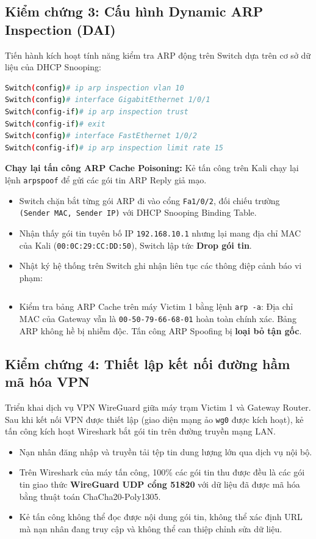 \subsection{Kiểm chứng 3: Cấu hình Dynamic ARP Inspection (DAI)}

Tiến hành kích hoạt tính năng kiểm tra ARP động trên Switch dựa trên cơ sở dữ liệu của DHCP Snooping:
\begin{lstlisting}[language=bash]
Switch(config)# ip arp inspection vlan 10
Switch(config)# interface GigabitEthernet 1/0/1
Switch(config-if)# ip arp inspection trust
Switch(config-if)# exit
Switch(config)# interface FastEthernet 1/0/2
Switch(config-if)# ip arp inspection limit rate 15
\end{lstlisting}

\textbf{Chạy lại tấn công ARP Cache Poisoning:} Kẻ tấn công trên Kali chạy lại lệnh \texttt{arpspoof} để gửi các gói tin ARP Reply giả mạo.
\begin{itemize}
  \item Switch chặn bắt từng gói ARP đi vào cổng \texttt{Fa1/0/2}, đối chiếu trường \texttt{(Sender MAC, Sender IP)} với DHCP Snooping Binding Table.
  \item Nhận thấy gói tin tuyên bố IP \texttt{192.168.10.1} nhưng lại mang địa chỉ MAC của Kali (\texttt{00:0C:29:CC:DD:50}), Switch lập tức \textbf{Drop gói tin}.
  \item Nhật ký hệ thống trên Switch ghi nhận liên tục các thông điệp cảnh báo vi phạm:
  \begin{lstlisting}[language=bash]
%SW_DAI-4-DHCP_SNOOPING_DENY: 1 invalid ARPs (Req) on Fa1/0/2, vlan 10. ([000c.29cc.dd50/192.168.10.50/0000.0000.0000/192.168.10.1/])
  \end{lstlisting}
  \item Kiểm tra bảng ARP Cache trên máy Victim 1 bằng lệnh \texttt{arp -a}: Địa chỉ MAC của Gateway vẫn là \texttt{00-50-79-66-68-01} hoàn toàn chính xác. Bảng ARP không hề bị nhiễm độc. Tấn công ARP Spoofing bị \textbf{loại bỏ tận gốc}.
\end{itemize}

\subsection{Kiểm chứng 4: Thiết lập kết nối đường hầm mã hóa VPN}

Triển khai dịch vụ VPN WireGuard giữa máy trạm Victim 1 và Gateway Router. Sau khi kết nối VPN được thiết lập (giao diện mạng ảo \texttt{wg0} được kích hoạt), kẻ tấn công kích hoạt Wireshark bắt gói tin trên đường truyền mạng LAN.
\begin{itemize}
  \item Nạn nhân đăng nhập và truyền tải tệp tin dung lượng lớn qua dịch vụ nội bộ.
  \item Trên Wireshark của máy tấn công, 100\% các gói tin thu được đều là các gói tin giao thức \textbf{WireGuard UDP cổng 51820} với dữ liệu đã được mã hóa bằng thuật toán ChaCha20-Poly1305.
  \item Kẻ tấn công không thể đọc được nội dung gói tin, không thể xác định URL mà nạn nhân đang truy cập và không thể can thiệp chỉnh sửa dữ liệu.
\end{itemize}

